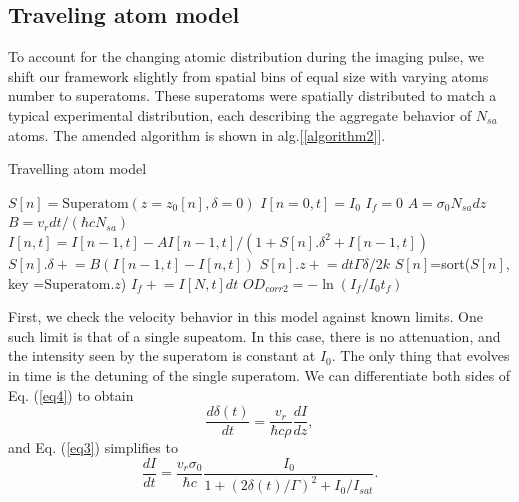 \documentclass[12pt]{iopart}
\begin{document}
\subsection{Traveling atom model}
To account for the changing atomic distribution during the imaging pulse, we shift our framework slightly from spatial bins of equal size with varying atoms number to superatoms. These superatoms were spatially distributed to match a typical experimental distribution, each describing the aggregate behavior of $N_{sa}$ atoms. The amended algorithm is shown in alg.[\ref{algorithm2}]. 
\begin{algorithm}
\caption{Travelling atom model}
\label{algorithm2}
\begin{algorithmic}
\STATE $S[n]=\mathrm{Superatom}(z=z_0[n], \delta=0)$  
\STATE $I[n=0,t]=I_0$  
\STATE $I_f=0$
 \STATE $A=\sigma_0 N_{sa} dz$
 \STATE $B=v_r dt/(\hbar c  N_{sa})$ 
\STATE $I[n,t]=I[n-1,t] - A I[n-1,t]/(1+S[n].\delta^2+I[n-1,t])$  
\STATE $S[n].\delta\mathrel{+}=B\left(I[n-1,t]-I[n,t]\right)$   
\STATE $S[n].z\mathrel{+}=dt\Gamma\delta/2k$ 
\ENDFOR 
\STATE $S[n]$=sort($S[n]$, key =$\mathrm{ Superatom}.z$) 
\STATE $I_f  \mathrel{+}= I[N,t]dt$
\ENDFOR
\STATE $OD_{corr2}=-\ln{(I_f/I_0t_f)}$
\end{algorithmic}
\end{algorithm}
\par First, we check the velocity behavior in this model against known limits. One such limit is that of a single supeatom. In this case, there is no attenuation, and the intensity seen by the superatom is constant at $I_0$. The only thing that evolves in time is the detuning of the single superatom. We can differentiate both sides of Eq. (\ref{eq4}) to obtain
\begin{equation}
\frac{d\delta\left(t\right)}{dt}=\frac{v_r}{\hbar c \rho}\frac{dI}{dz},
\label{eq9}
\end{equation} 
and Eq. (\ref{eq3}) simplifies to
\begin{equation}
\frac{dI}{dt}=\frac{v_r \sigma_0}{\hbar c}\frac{I_0}{1+(2\delta(t)/\Gamma)^2 +I_0/I_{sat}}.
\label{oneAtom}
\end{equation}
\end{document}
